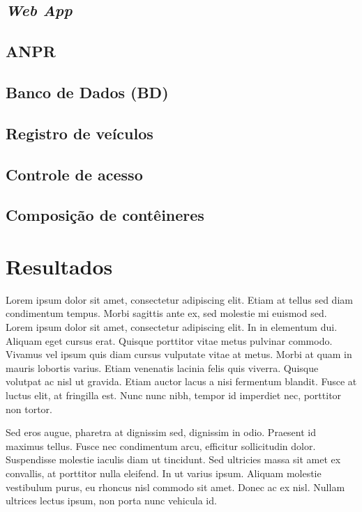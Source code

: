 \documentclass[12pt]{article}
\begin{document}
\subsection{\textit{Web App}}


\subsection{ANPR}


\subsection{Banco de Dados (BD)}


\subsection{Registro de veículos}


\subsection{Controle de acesso}


\subsection{Composição de contêineres}



\section{Resultados} 

Lorem ipsum dolor sit amet, consectetur adipiscing elit. Etiam at tellus sed diam condimentum tempus. Morbi sagittis ante ex, sed molestie mi euismod sed. Lorem ipsum dolor sit amet, consectetur adipiscing elit. In in elementum dui. Aliquam eget cursus erat. Quisque porttitor vitae metus pulvinar commodo. Vivamus vel ipsum quis diam cursus vulputate vitae at metus. Morbi at quam in mauris lobortis varius. Etiam venenatis lacinia felis quis viverra. Quisque volutpat ac nisl ut gravida. Etiam auctor lacus a nisi fermentum blandit. Fusce at luctus elit, at fringilla est. Nunc nunc nibh, tempor id imperdiet nec, porttitor non tortor.

Sed eros augue, pharetra at dignissim sed, dignissim in odio. Praesent id maximus tellus. Fusce nec condimentum arcu, efficitur sollicitudin dolor. Suspendisse molestie iaculis diam ut tincidunt. Sed ultricies massa sit amet ex convallis, at porttitor nulla eleifend. In ut varius ipsum. Aliquam molestie vestibulum purus, eu rhoncus nisl commodo sit amet. Donec ac ex nisl. Nullam ultrices lectus ipsum, non porta nunc vehicula id. 
\end{document}
